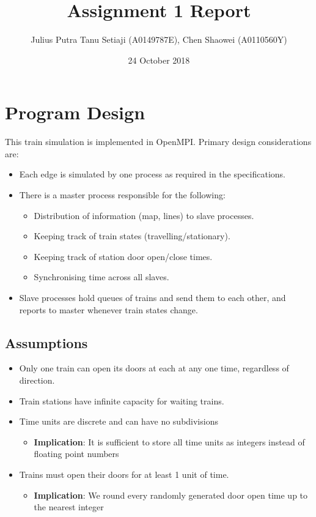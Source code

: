 \documentclass[a4paper,12pt]{article}
\title{Assignment 1 Report}
\author{Julius Putra Tanu Setiaji (A0149787E), Chen Shaowei (A0110560Y)}
\date{24 October 2018}
\begin{document}
\maketitle

\section{Program Design}
This train simulation is implemented in OpenMPI. Primary design considerations are:
\begin{itemize}
	\item Each edge is simulated by one process as required in the specifications.
	\item There is a master process responsible for the following:
	      \begin{itemize}
		      \item Distribution of information (map, lines) to slave processes.
		      \item Keeping track of train states (travelling/stationary).
		      \item Keeping track of station door open/close times.
		      \item Synchronising time across all slaves.
	      \end{itemize}
	\item Slave processes hold queues of trains and send them to each other, and reports to master whenever train states change.
\end{itemize}

\subsection*{Assumptions}

\begin{itemize}
	\item Only one train can open its doors at each at any one time, regardless of direction.
	\item Train stations have infinite capacity for waiting trains.
	\item Time units are discrete and can have no subdivisions
	      \begin{itemize}
		      \item \textbf{Implication}: It is sufficient to store all time units as integers instead of floating point numbers
	      \end{itemize}
	\item Trains must open their doors for at least 1 unit of time.
	      \begin{itemize}
		      \item \textbf{Implication}: We round every randomly generated door open time up to the nearest integer
	      \end{itemize}
\end{itemize}
\end{document}
